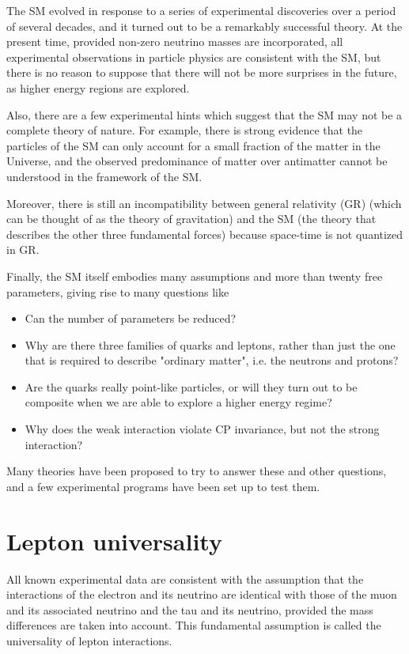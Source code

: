 The SM evolved in response to a series of experimental discoveries over a period of several decades, and it turned out to be a remarkably successful theory. At the present time, provided non-zero neutrino masses are incorporated, all experimental observations in particle physics are consistent with the SM, but there is no reason to suppose that there will not be more surprises in the future, as higher energy regions are explored.

Also, there are a few experimental hints which suggest that the SM may not be a complete theory of nature. For example, there is strong evidence that the particles of the SM can only account for a small fraction of the matter in the Universe, and the observed predominance of matter over antimatter cannot be understood in the framework of the SM.

Moreover, there is still an incompatibility between general relativity (GR) (which can be thought of as the theory of gravitation) and the SM (the theory that describes the other three fundamental forces) because space-time is not quantized in GR.

Finally, the SM itself embodies many assumptions and more than twenty free parameters, giving rise to many questions like

\begin{itemize}
 \item Can the number of parameters be reduced?
 \item Why are there three families of quarks and leptons, rather than just the one that is required to describe "ordinary matter", i.e. the neutrons and protons?
 \item Are the quarks really point-like particles, or will they turn out to be composite when we are able to explore a higher energy regime?
 \item Why does the weak interaction violate CP invariance, but not the strong interaction?
\end{itemize}

Many theories have been proposed to try to answer these and other questions, and a few experimental programs have been set up to test them. %

\section{Lepton universality}
	All known experimental data are consistent with the assumption that the interactions of the electron and its neutrino are identical with those of the muon and its associated neutrino and the tau and its neutrino, provided the mass differences are taken into account. This fundamental assumption is called the universality of lepton interactions.


